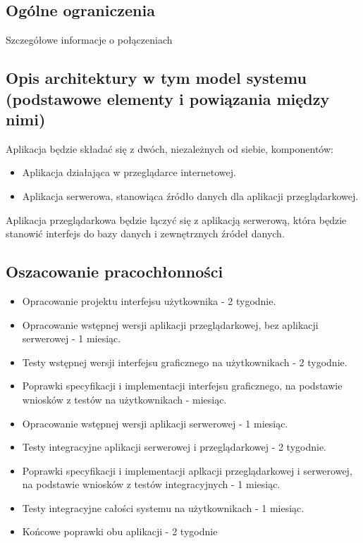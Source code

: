 \documentclass[12pt,a4paper]{report}
\begin{document}
\subsection{Ogólne ograniczenia}	
 	Szczegółowe informacje o połączeniach
\subsection{Opis architektury w tym model systemu (podstawowe elementy i powiązania między nimi)}
Aplikacja będzie składać się z dwóch, niezależnych od siebie, komponentów:
\begin{itemize}
	\item Aplikacja działająca w przeglądarce internetowej.
	\item Aplikacja serwerowa, stanowiąca źródło danych dla aplikacji przeglądarkowej.
\end{itemize} 
	Aplikacja przeglądarkowa będzie łączyć się z aplikacją serwerową, która będzie stanowić interfejs do bazy danych i zewnętrznych źródeł danych.
\subsection{Oszacowanie pracochłonności}
\begin{itemize}
	\item Opracowanie projektu interfejsu użytkownika - 2 tygodnie.
	\item Opracowanie wstępnej wersji aplikacji przeglądarkowej, bez aplikacji serwerowej - 1 miesiąc.
	\item Testy wstępnej wersji interfejsu graficznego na użytkownikach - 2 tygodnie.
	\item Poprawki specyfikacji i implementacji interfejsu graficznego, na podstawie wniosków z testów na użytkownikach - miesiąc.
	\item Opracowanie wstępnej wersji aplikacji serwerowej - 1 miesiąc.
	\item Testy integracyjne aplikacji serwerowej i przeglądarkowej - 2 tygodnie.
	\item Poprawki specyfikacji i implementacji aplkacji przeglądarkowej i serwerowej, na podstawie wniosków z testów integracyjnych - 1 miesiąc.
	\item Testy integracyjne całości systemu na użytkownikach - 1 miesiąc.
	\item Końcowe poprawki obu aplikacji - 2 tygodnie 
\end{itemize}
\end{document}
